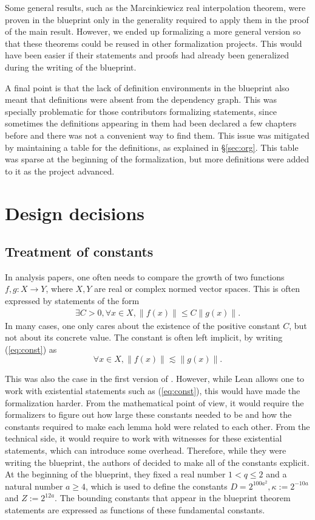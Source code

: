 \documentclass[12pt]{amsart}
\theoremstyle{definition}
\theoremstyle{plain}
\begin{document}
Some general results, such as the Marcinkiewicz real interpolation theorem, were proven in the blueprint only in the generality required to apply them in the proof of the main result. However, we ended up formalizing a more general version so that these theorems could be reused in other formalization projects. This would have been easier if their statements and proofs had already been generalized during the writing of the blueprint.

A final point is that the lack of definition environments in the blueprint also
meant that definitions were absent from the dependency graph. This was specially problematic for those contributors formalizing statements, since sometimes the definitions appearing in them had been declared a few chapters before and there was not a convenient way to find them. This issue was mitigated by maintaining a table for the definitions, as explained in \S\ref{sec:org}. This table was sparse at the beginning of the formalization, but more definitions were added to it as the project advanced.

\section{Design decisions}\label{sec:design}
\subsection{Treatment of constants}\label{subsec:constants}
In analysis papers, one often needs to compare the growth of two functions $f, g\colon X \to Y$, where $X, Y$ are real or complex normed vector spaces. This is often expressed by statements of the form
\begin{align}\label{eq:const}
	\exists C > 0, \forall x \in X, \| f (x) \| \le C\|g(x)\|.
\end{align}
In many cases, one only cares about the existence of the positive constant $C$, but not about its concrete value.
The constant is often left implicit, by writing (\ref{eq:const}) as
\[ \forall x \in X, \| f (x) \| \lesssim \|g(x)\|.\]

This was also the case in the first version of \cite{ThieleCarlesonPreprint}. However, while Lean allows one to work with existential statements such as (\ref{eq:const}), this would have made the formalization harder. From the mathematical point of view, it would require the formalizers to figure out how large these constants needed to be and how the constants required to make each lemma hold were related to each other. From the technical side, it would require to work with witnesses for these existential statements, which can introduce some overhead.
Therefore, while they were writing the blueprint, the authors of \cite{ThieleCarlesonPreprint} decided to make all of the constants explicit. At the beginning of the blueprint, they fixed a real number $1 < q \le 2$ and a natural number $a \ge 4$, which is used to define the constants $D = 2^{100a^2}, \kappa := 2 ^{-10a}$ and $Z := 2^{12a}$. The bounding constants that appear in the blueprint theorem statements are expressed as functions of these fundamental constants.
\end{document}
